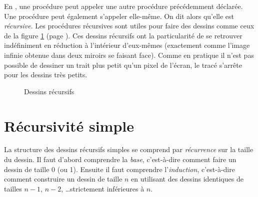 En \pascal, une procédure peut appeler une autre procédure précédemment 
déclarée. Une procédure peut également s'appeler elle-même. On dit
alors qu'elle est {\em récursive}. Les procédures récursives sont utiles
pour faire des dessins comme ceux de la figure \ref{fig:desrec} (page
\pageref{fig:desrec}). Ces dessins récursifs ont la particularité de se
retrouver indéfiniment en réduction à l'intérieur d'eux-mêmes (exactement
comme l'image infinie obtenue dans deux miroirs se faisant face). Comme en pratique il n'est 
pas possible de dessiner un trait plus petit qu'un pixel de l'écran, le tracé s'arrête 
pour les dessins très petits.
\begin{figure}[htbp]
 \caption{Dessins récursifs}\label{fig:desrec}
\end{figure}

\section{Récursivité simple}

La structure des dessins récursifs simples se comprend par {\em récurrence} sur la taille du dessin.
Il faut d'abord comprendre la {\em base\/}, c'est-à-dire comment faire un dessin de taille 0 (ou 1). 
Ensuite il faut comprendre l'{\em induction\/}, c'est-à-dire 
comment construire un dessin de taille $n$ en utilisant des dessins identiques de tailles $n-1$, 
$n-2$, \ldots strictement inférieures à $n$.  

